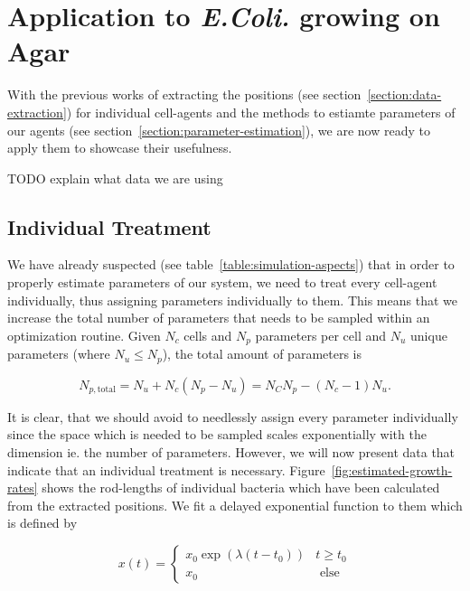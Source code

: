 \documentclass{article}
\begin{document}
\section{Application to \textit{E.Coli.} growing on Agar}

With the previous works of extracting the positions (see section~\ref{section:data-extraction}) for
individual cell-agents and the methods to estiamte parameters of our agents (see section~\ref{section:parameter-estimation}), we are now ready to apply them to showcase their usefulness.

TODO explain what data we are using

\subsection{Individual Treatment}
We have already suspected (see table~\ref{table:simulation-aspects}) that in order to properly
estimate parameters of our system, we need to treat every cell-agent individually, thus assigning
parameters individually to them.
This means that we increase the total number of parameters that needs to be sampled within an
optimization routine.
Given $N_c$ cells and $N_p$ parameters per cell and $N_u$ unique parameters (where $N_u\leq N_p$),
the total amount of parameters is

\begin{equation}
    N_{p,\text{total}} = N_u + N_c (N_p - N_u) = N_C N_p - (N_c - 1) N_u.
\end{equation}

It is clear, that we should avoid to needlessly assign every parameter individually since the space
which is needed to be sampled scales exponentially with the dimension ie. the number of parameters.
However, we will now present data that indicate that an individual treatment is necessary.
Figure~\ref{fig:estimated-growth-rates} shows the rod-lengths of individual bacteria which have been
calculated from the extracted positions.
We fit a delayed exponential function to them which is defined by

\begin{equation}
    x(t) =
    \left\{\begin{array}{ll}
            x_0 \exp(\lambda (t-t_0)) & t\geq t_0\\
            x_0 & \text{ else}
    \end{array}\right.
\end{equation}
\end{document}
